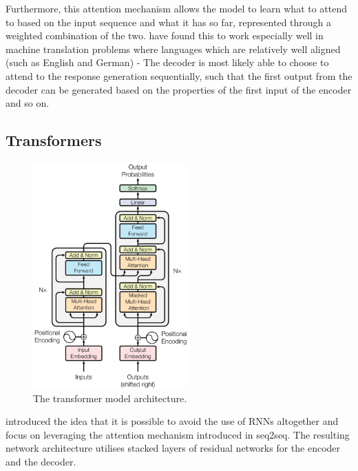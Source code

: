\documentclass[12pt,twoside]{report}
\begin{document}
Furthermore, this attention mechanism allows the model to learn what to attend to based on the input sequence and what it has so far, represented through a weighted combination of the two. \cite{bahdanau_neural_2014} have found this to work especially well in machine translation problems where languages which are relatively well aligned (such as English and German) - The decoder is most likely able to choose to attend to the response generation sequentially, such that the first output from the decoder can be generated based on the properties of the first input of the encoder and so on.


\subsection{Transformers}

\begin{figure}[!ht]
      
	\centering
	\includegraphics[width=60mm]{diagrams/transformers.png}
	\caption{The transformer model architecture.\cite{vaswani_attention_2017} \label{transformer}}
  \end{figure}

\cite{vaswani_attention_2017} introduced the idea that it is possible to avoid the use of RNNs altogether and focus on leveraging the attention mechanism introduced in seq2seq. The resulting network architecture utilises stacked layers of residual networks for the encoder and the decoder.
\end{document}
